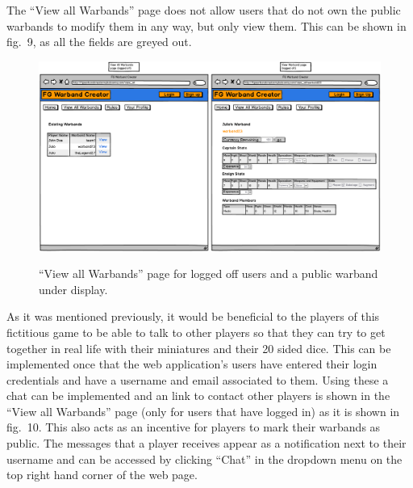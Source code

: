 \documentclass[12pt,a4paper]{article}
\begin{document}
The ``View all Warbands'' page does not allow users that do not own the public warbands to modify them in any way, but only view them. This can be shown in fig.~9, as all the fields are greyed out.

\begin{figure}[h!]
 \centering
 \includegraphics[width=1\textwidth]{img/view_all}
 \label{fig:9}
 \caption{``View all Warbands'' page for logged off users and a public warband under display.}
\end{figure}

As it was mentioned previously, it would be beneficial to the players of this fictitious game to be able to talk to other players so that they can try to get together in real life with their miniatures and their 20 sided dice. This can be implemented once that the web application's users have entered their login credentials and have a username and email associated to them. Using these a chat can be implemented and an link to contact other players is shown in the ``View all Warbands'' page (only for users that have logged in) as it is shown in fig.~10. This also acts as an incentive for players to mark their warbands as public. The messages that a player receives appear as a notification next to their username and can be accessed by clicking ``Chat'' in the dropdown menu on the top right hand corner of the web page.
\end{document}
